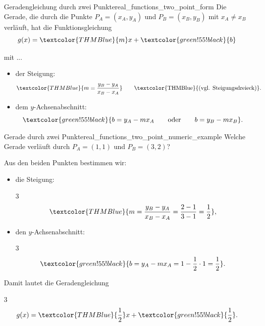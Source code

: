 \begin{KeyPointBox}{Geradengleichung durch zwei Punkte}{real_functions_two_point_form}
    Die Gerade, die durch die Punkte $P_A=(x_A,y_A)$ und
    $P_B=(x_B,y_B)$ mit $x_A\ne x_B$ verläuft, hat die Funktionsgleichung
    \[
      g(x)=\textcolor{THMBlue}{m}x+\textcolor{green!55!black}{b}
    \]
  \begin{minipage}[c]{0.52\linewidth}
    mit ...
    \begin{itemize}[leftmargin=1.3em,itemsep=0.4em,topsep=0.3em]
      \item der Steigung:
        \[\textcolor{THMBlue}{m=\frac{y_B-y_A}{x_B-x_A}} \qquad \text{\textcolor{THMBlue}{(vgl. Steigungsdreieck)}}.\]
      \item dem $y$-Achsenabschnitt:
        \[\textcolor{green!55!black}{b=y_A-mx_A \qquad \text{oder} \qquad b=y_B-mx_B}.\]
    \end{itemize}
  \end{minipage}\hfill
  \begin{minipage}[c]{0.46\linewidth}
    \centering
  \end{minipage}
\end{KeyPointBox}
\begin{ExampleBox}{Gerade durch zwei Punkte}{real_functions_two_point_numeric_example}
  Welche Gerade verläuft durch $P_A=(1,1)$ und $P_B=(3,2)$?
  \par\smallskip
  \begin{minipage}[c]{0.48\linewidth}
    Aus den beiden Punkten bestimmen wir:
    \begin{itemize}[leftmargin=1.3em,itemsep=0.35em,parsep=0pt,
      topsep=0.3em,after=\vspace{0.65em}]
      \item die \textcolor{THMBlue}{Steigung}:
        \begin{ClozeArea}[15]{3}
          \[
            \textcolor{THMBlue}{m=\frac{y_B-y_A}{x_B-x_A}
              =\frac{2-1}{3-1}=\frac12},
          \]
        \end{ClozeArea}
      \item den \textcolor{green!55!black}{$y$-Achsenabschnitt}:
        \begin{ClozeArea}[15]{3}
          \[
            \textcolor{green!55!black}{b=y_A-mx_A
              =1-\frac12\cdot1=\frac12}.
          \]
        \end{ClozeArea}
    \end{itemize}
    Damit lautet die Geradengleichung
    \begin{ClozeArea}[16]{3}
      \[
        g(x)=\textcolor{THMBlue}{\frac12}x+\textcolor{green!55!black}{\frac12}.
      \]
    \end{ClozeArea}
  \end{minipage}\hfill
  \begin{minipage}[c]{0.51\linewidth}
    \raggedleft
  \end{minipage}
\end{ExampleBox}
